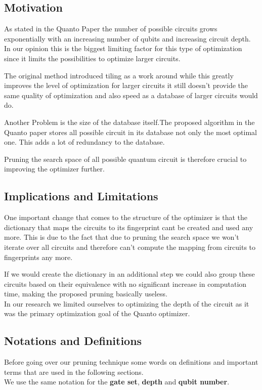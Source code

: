 \subsection{Motivation}
As stated in the Quanto Paper the number of possible circuits grows exponentially with an increasing number of qubits and
increasing circuit depth. In our opinion this is the biggest limiting factor for this type of optimization since it limits the possibilities to optimize larger circuits.

The original method introduced tiling as a work around while this greatly improves the level of optimization for larger circuits it still doesn't provide the same
quality of optimization and also speed as a database of larger circuits would do. 

Another Problem is the size of the database itself.The proposed algorithm in the Quanto paper stores all possible circuit in its database not only the most optimal one. This adds a lot of redundancy to the database.

Pruning the search space of all possible quantum circuit is therefore crucial to improving the optimizer further. 

\subsection{Implications and Limitations}
One important change that comes to the structure of the optimizer is that the dictionary that maps the circuits to its fingerprint cant be created and used any more. This is due to the fact that due to pruning the search space we won't iterate over all circuits and therefore can't compute the mapping from circuits to fingerprints any more.

If we would create the dictionary in an additional step we could also group these circuits based on their equivalence with no significant increase in computation time, making the proposed pruning basically useless.\\

In our research we limited ourselves to optimizing the depth of the circuit as it was the primary optimization goal of the Quanto optimizer.

\subsection{Notations and Definitions}
Before going over our pruning technique some words on definitions and important terms that are used in the following sections.\\
We use the same notation for the \textbf{gate set}, \textbf{depth} and \textbf{qubit number}. 

